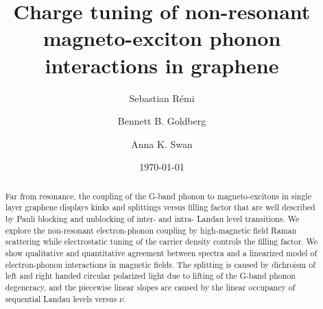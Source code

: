\documentclass[prl,aps,superscriptaddress,showpacs,reprint]{revtex4-1}
\begin{document}
\title{Charge tuning of non-resonant magneto-exciton phonon interactions in graphene} %

\author{Sebastian R\'{e}mi}

\author{Bennett B. Goldberg}


\author{Anna K. Swan}

\date{\today}

\begin{abstract}
Far from resonance, the coupling of the G-band phonon to magneto-excitons in single layer graphene displays kinks and splittings versus filling factor that are well described by Pauli blocking and unblocking of inter- and intra- Landau level transitions. We explore the non-resonant electron-phonon coupling by high-magnetic field Raman scattering while electrostatic tuning of the carrier density controls the filling factor. We show qualitative and quantitative agreement between spectra and a linearized model of electron-phonon interactions in magnetic fields. The splitting is caused by dichroism of left and right handed circular polarized light due to lifting of the G-band phonon degeneracy, and the piecewise linear slopes are caused by the linear occupancy of sequential Landau levels  versus $\nu$.
\end{abstract}



\maketitle %
\end{document}

